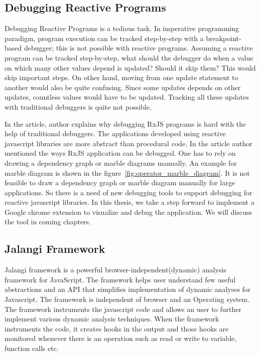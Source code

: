 \subsection{Debugging Reactive Programs}
Debugging Reactive Programs is a tedious task. In imperative programming paradigm, program execution can be tracked step-by-step with a breakpoint-based debugger; this is not possible with reactive programs. Assuming a reactive program can be tracked step-by-step, what should the debugger do when a value on which many other values depend is updated? Should it skip them? This would skip important steps. On other hand, moving from one update statement to another would also be quite confusing. Since some updates depends on other updates, countless values would have to be updated. Tracking all these updates with traditional debuggers is quite not possible.

In the article\cite{debugRxJS}, author explains why debugging RxJS programs is hard with the help of traditional debuggers. The applications developed using reactive javascript libraries are more abstract than procedural code. In the article author mentioned the ways RxJS application can be debugged. One has to rely on drawing a dependency graph or marble diagrams manually. An example for marble diagram is shown in the figure~\ref{fig:operator_marble_diagram}. It is not feasible to draw a dependency graph or marble diagram manually for large applications. So there is a need of new debugging tools to support debugging for reactive javascript libraries. In this thesis, we take a step forward to implement a Google chrome extension to visualize and debug the application. We will discuss the tool in coming chapters.

\subsection{Jalangi Framework}
Jalangi framework\cite{jalangi} is a powerful	browser-independent(dynamic) analysis framework for JavaScript. The framework helps user understand few useful abstractions and an API that simplifies implementation of dynamic analyses for Javascript. The framework is independent of browser and an Operating system. The framework instruments the javascript code and allows an user to further implement various dynamic analysis techniques. When the framework instruments the code, it creates hooks in the output and those hooks are monitored whenever there is an operation such as read or write to variable, function calls etc.


